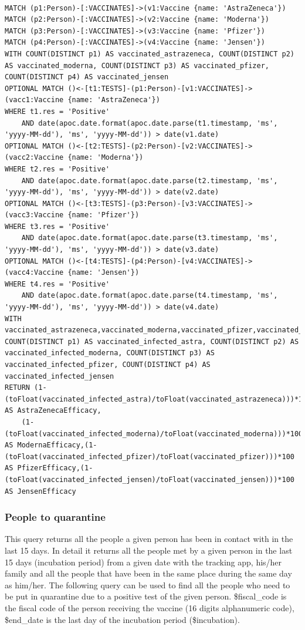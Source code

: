 \documentclass{article}
\begin{document}
\begin{lstlisting}[language=cypher, label=lst:cypher-example]

MATCH (p1:Person)-[:VACCINATES]->(v1:Vaccine {name: 'AstraZeneca'})
MATCH (p2:Person)-[:VACCINATES]->(v2:Vaccine {name: 'Moderna'})
MATCH (p3:Person)-[:VACCINATES]->(v3:Vaccine {name: 'Pfizer'})
MATCH (p4:Person)-[:VACCINATES]->(v4:Vaccine {name: 'Jensen'})
WITH COUNT(DISTINCT p1) AS vaccinated_astrazeneca, COUNT(DISTINCT p2) AS vaccinated_moderna, COUNT(DISTINCT p3) AS vaccinated_pfizer, COUNT(DISTINCT p4) AS vaccinated_jensen
OPTIONAL MATCH ()<-[t1:TESTS]-(p1:Person)-[v1:VACCINATES]->(vacc1:Vaccine {name: 'AstraZeneca'})
WHERE t1.res = 'Positive'
    AND date(apoc.date.format(apoc.date.parse(t1.timestamp, 'ms', 'yyyy-MM-dd'), 'ms', 'yyyy-MM-dd')) > date(v1.date)
OPTIONAL MATCH ()<-[t2:TESTS]-(p2:Person)-[v2:VACCINATES]->(vacc2:Vaccine {name: 'Moderna'})
WHERE t2.res = 'Positive'
    AND date(apoc.date.format(apoc.date.parse(t2.timestamp, 'ms', 'yyyy-MM-dd'), 'ms', 'yyyy-MM-dd')) > date(v2.date)
OPTIONAL MATCH ()<-[t3:TESTS]-(p3:Person)-[v3:VACCINATES]->(vacc3:Vaccine {name: 'Pfizer'})
WHERE t3.res = 'Positive'
    AND date(apoc.date.format(apoc.date.parse(t3.timestamp, 'ms', 'yyyy-MM-dd'), 'ms', 'yyyy-MM-dd')) > date(v3.date)
OPTIONAL MATCH ()<-[t4:TESTS]-(p4:Person)-[v4:VACCINATES]->(vacc4:Vaccine {name: 'Jensen'})
WHERE t4.res = 'Positive'
    AND date(apoc.date.format(apoc.date.parse(t4.timestamp, 'ms', 'yyyy-MM-dd'), 'ms', 'yyyy-MM-dd')) > date(v4.date)
WITH vaccinated_astrazeneca,vaccinated_moderna,vaccinated_pfizer,vaccinated_jensen, COUNT(DISTINCT p1) AS vaccinated_infected_astra, COUNT(DISTINCT p2) AS vaccinated_infected_moderna, COUNT(DISTINCT p3) AS vaccinated_infected_pfizer, COUNT(DISTINCT p4) AS vaccinated_infected_jensen
RETURN (1- (toFloat(vaccinated_infected_astra)/toFloat(vaccinated_astrazeneca)))*100 AS AstraZenecaEfficacy,
    (1- (toFloat(vaccinated_infected_moderna)/toFloat(vaccinated_moderna)))*100 AS ModernaEfficacy,(1- (toFloat(vaccinated_infected_pfizer)/toFloat(vaccinated_pfizer)))*100 AS PfizerEfficacy,(1- (toFloat(vaccinated_infected_jensen)/toFloat(vaccinated_jensen)))*100 AS JensenEfficacy
\end{lstlisting}

\subsubsection{People to quarantine}
This query returns all the people a given person has been in contact with in the last 15 days. In detail it returns all the people met by a given person in the last 15 days (incubation period) from a given date with the tracking app, his/her family and all the people that have been in the same place during the same day as him/her.
The following query can be used to find all the people who need to be put in quarantine due to a positive test of the given person.
\$fiscal\_code is the fiscal code of the person receiving the vaccine (16 digits alphanumeric code), \$end\_date is the last day of the incubation period (\$incubation).
\end{document}
